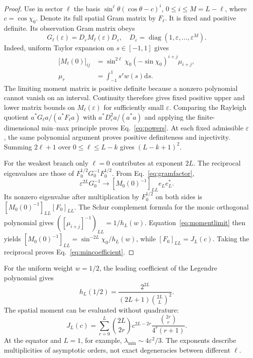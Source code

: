\documentclass[aps,prd,reprint,amsmath,amssymb,nofootinbib,
longbibliography]{revtex4-2}
\DeclareMathOperator{\diag}{diag}
\newcommand{\dd}{\mathrm d}
\newcommand{\ee}{\varepsilon}
\begin{document}
\begin{proof}
Use in sector $\ell$ the basis
$\sin^\ell\theta(\cos\theta-c)^i$, $0\leq i\leq M=L-\ell$,
where $c=\cos\chi_0$. Denote its full spatial Gram matrix by $F_\ell$.
It is fixed and positive definite. Its observation Gram matrix obeys
\begin{equation}
 G_\ell(\ee)=D_\ee M_\ell(\ee)D_\ee,
 \quad D_\ee=\diag(1,\ee,\ldots,\ee^M).
 \label{eq:gramfactor}
\end{equation}
Indeed, uniform Taylor expansion on $s\in[-1,1]$ gives
\begin{equation}
 \begin{aligned}
 \bigl[M_\ell(0)\bigr]_{ij}
 &=\sin^{2\ell}\chi_0(-\sin\chi_0)^{i+j}\mu_{i+j},\\
 \mu_r&=\int_{-1}^1s^rw(s)\dd s .
 \end{aligned}
 \label{eq:momentlimit}
\end{equation}
The limiting moment matrix is positive definite because a nonzero
polynomial cannot vanish on an interval. Continuity therefore gives
fixed positive upper and lower matrix bounds on $M_\ell(\ee)$ for
sufficiently small $\ee$. Comparing the Rayleigh quotient
$a^*G_\ell a/(a^*F_\ell a)$ with $a^*D_\ee^2a/(a^*a)$ and applying
the finite-dimensional min--max principle proves Eq.~\eqref{eq:powers}.
At each fixed admissible $\ee$, the same polynomial argument proves
positive definiteness and injectivity. Summing $2\ell+1$ over
$0\leq\ell\leq L-k$ gives $(L-k+1)^2$.

For the weakest branch only $\ell=0$ contributes at exponent $2L$.
The reciprocal eigenvalues are those of
$F_0^{1/2}G_0^{-1}F_0^{1/2}$. From Eq.~\eqref{eq:gramfactor},
\begin{equation}
 \ee^{2L}G_0^{-1}\longrightarrow
 [M_0(0)^{-1}]_{LL}e_Le_L^*.
\end{equation}
Its nonzero eigenvalue after multiplication by $F_0^{1/2}$ on both sides
is $[M_0(0)^{-1}]_{LL}[F_0]_{LL}$.
The Schur complement formula for the monic orthogonal polynomial gives
$( [\mu_{i+j}]^{-1})_{LL}=1/h_L(w)$. Equation~\eqref{eq:momentlimit}
then yields
$[M_0(0)^{-1}]_{LL}=\sin^{-2L}\chi_0/h_L(w)$, while
$[F_0]_{LL}=J_L(c)$. Taking the reciprocal proves
Eq.~\eqref{eq:mincoefficient}.
\end{proof}

For the uniform weight $w=1/2$, the leading coefficient of the Legendre
polynomial gives
\begin{equation}
 h_L(1/2)=\frac{2^{2L}}{(2L+1)\binom{2L}{L}^2}.
 \label{eq:legendre}
\end{equation}
The spatial moment can be evaluated without quadrature:
\begin{equation}
 J_L(c)=\sum_{r=0}^L\binom{2L}{2r}c^{2L-2r}
 \frac{\binom{2r}{r}}{4^r(r+1)}.
 \label{eq:catalan}
\end{equation}
At the equator and $L=1$, for example,
$\lambda_{\min}\sim4\ee^2/3$. The exponents describe multiplicities of
asymptotic orders, not exact degeneracies between different $\ell$.
\end{document}
